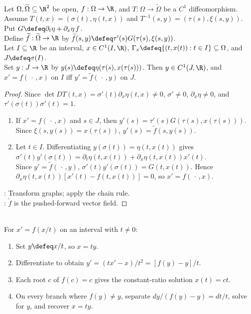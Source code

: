 \begin{proposition} \label{prop:fiber-preserving-ode-transformation} \\
Let $\Omega,\widetilde{\Omega}\subseteq\R^2$ be open, $f:\Omega\to\R$, and $T:\Omega\to\widetilde{\Omega}$ be a $C^1$ diffeomorphism.\\
Assume $T(t,x)=(\sigma(t),\eta(t,x))$ and $T^{-1}(s,y)=(\tau(s),\xi(s,y))$. Put $G\defeq\partial_t\eta+\partial_x\eta\,f$.\\
Define $\widetilde f:\widetilde\Omega\to\R$ by $\widetilde f(s,y)\defeq\tau'(s)G(\tau(s),\xi(s,y))$.\\
Let $I\subseteq\R$ be an interval, $x\in C^1(I,\R)$, $\Gamma_x\defeq\{(t,x(t)):t\in I\}\subseteq\Omega$, and $J\defeq\sigma(I)$.\\
Set $y:J\to\R$ by $y(s)\defeq\eta(\tau(s),x(\tau(s)))$. Then $y\in C^1(J,\R)$, and $x'=f(\,\cdot\,,x)$ on $I$ iff $y'=\widetilde f(\,\cdot\,,y)$ on $J$.
\begin{proof}
Since $\det DT(t,x)=\sigma'(t)\partial_x\eta(t,x)\neq0$, $\sigma'\neq0$, $\partial_x\eta\neq0$, and $\tau'(\sigma(t))\sigma'(t)=1$.
\begin{enumerate}[label=\roman*.]
\setlength{\itemsep}{0pt}
\item[$(\Rightarrow)$] If $x'=f(\,\cdot\,,x)$ and $s\in J$, then $y'(s)=\tau'(s)G(\tau(s),x(\tau(s)))$. Since $\xi(s,y(s))=x(\tau(s))$, $y'(s)=\widetilde f(s,y(s))$.
\item[$(\Leftarrow)$] Let $t\in I$. Differentiating $y(\sigma(t))=\eta(t,x(t))$ gives $\sigma'(t)y'(\sigma(t))=\partial_t\eta(t,x(t))+\partial_x\eta(t,x(t))x'(t)$.\\
Since $y'=\widetilde f(\,\cdot\,,y)$, $\sigma'(t)y'(\sigma(t))=G(t,x(t))$. Hence $\partial_x\eta(t,x(t))[x'(t)-f(t,x(t))]=0$, so $x'=f(\,\cdot\,,x)$.
\end{enumerate}
: Transform graphs; apply the chain rule.\\
: $\widetilde f$ is the pushed-forward vector field.
\end{proof}
\end{proposition}

\begin{method} \label{meth:homogeneous-first-order-reduction} \\
For $x'=f(x/t)$ on an interval with $t\neq0$:
\begin{enumerate}[label=(\roman*)]
\setlength{\itemsep}{0pt}
\item Set $y\defeq x/t$, so $x=ty$.
\item Differentiate to obtain $y'=(tx'-x)/t^2=[f(y)-y]/t$.
\item Each root $c$ of $f(c)=c$ gives the constant-ratio solution $x(t)=ct$.
\item On every branch where $f(y)\neq y$, separate $dy/(f(y)-y)=dt/t$, solve for $y$, and recover $x=ty$.
\end{enumerate}
\end{method}


